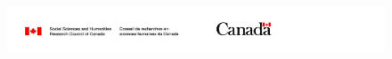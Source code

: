 \documentclass[12pt, oneside]{report}
\begin{document}
\newpage


\thispagestyle{empty}

\begin{center}
    \begin{figure}[b]
        \includegraphics[width=\textwidth]{images/sshrc-canada-banner.png}
    \end{figure}    
\end{center}
\end{document}
